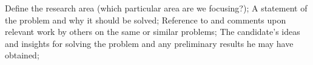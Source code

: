 Define the research area (which particular area are we focusing?);
A statement of the problem and why it should be solved;
Reference to and comments upon relevant work by others on the same or similar problems;
The candidate's ideas and insights for solving the problem and any preliminary results he may have obtained;
